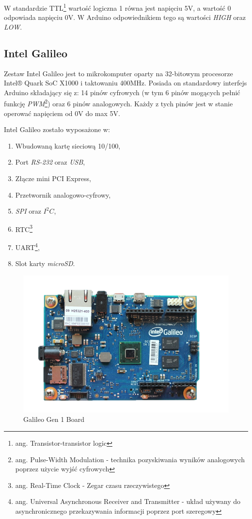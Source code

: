 \documentclass{xmgr}
\begin{document}
W standardzie TTL\footnote{ang. Transistor-transistor logic} wartość logiczna 1 równa jest napięciu 5V, a wartość 0 odpowiada napięciu 0V. W Arduino odpowiednikiem tego są wartości \emph{HIGH} oraz \emph{LOW}.
 
\subsection{Intel Galileo}
Zestaw Intel Galileo jest  to mikrokomputer oparty na 32-bitowym procesorze Intel® Quark SoC X1000 i taktowaniu 400MHz. Posiada on standardowy interfejs Arduino składający się z: 14 pinów cyfrowych (w tym 6 pinów mogących pełnić funkcję \emph{PWM}\footnote{ang. Pulse-Width Modulation - technika pozyskiwania wyników analogowych poprzez użycie wyjść cyfrowych}) oraz 6 pinów analogowych. Każdy z tych pinów jest w stanie operować napięciem od 0V do max 5V.

Intel Galileo zostało wyposażone w:
\begin{enumerate}
  \item Wbudowaną kartę sieciową 10/100, 
  \item Port \emph{RS-232} oraz \emph{USB},
  \item Złącze mini PCI Express,
  \item Przetwornik analogowo-cyfrowy,
  \item \emph{SPI} oraz $I^2C$,
  \item RTC\footnote{ang. Real-Time Clock - Zegar czasu rzeczywistego}
  \item UART\footnote{ang. Universal Asynchronous Receiver and Transmitter - układ używany do asynchronicznego przekazywania informacji poprzez port szeregowy},
  \item Slot karty \emph{microSD}.\cite{GalileoBook}
\end{enumerate}

\begin{figure}[!h]
    \centering
    \includegraphics[height=0.4\textwidth]{images/galileo.png}
    \caption{Galileo Gen 1 Board \label{Galileo Gen 1 Board}}
\end{figure}
\end{document}
